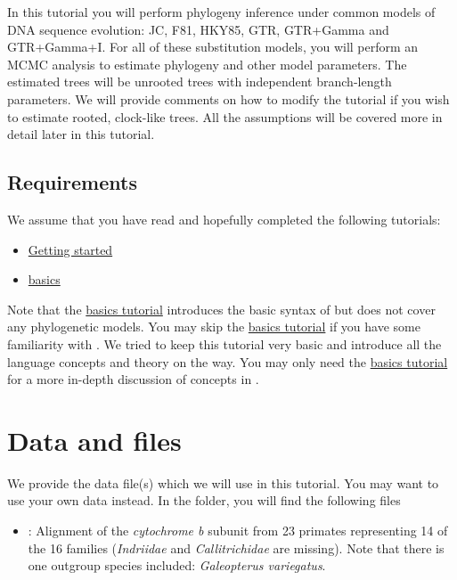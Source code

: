 In this tutorial you will perform phylogeny inference under common models of DNA sequence evolution: JC, F81, HKY85, GTR, GTR+Gamma and GTR+Gamma+I.
For all of these substitution models, you will perform an MCMC analysis to estimate phylogeny and other model parameters.
The estimated trees will be unrooted trees with independent branch-length parameters. 
We will provide comments on how to modify the tutorial if you wish to estimate rooted, clock-like trees.
All the assumptions will be covered more in detail later in this tutorial.

\subsection{Requirements}
We assume that you have read and hopefully completed the following tutorials:
\begin{itemize}
\item \href{https://github.com/revbayes/revbayes_tutorial/raw/master/tutorial_TeX/RB_Getting_Started/RB_Getting_Started.pdf}{Getting started}
\item \href{https://github.com/revbayes/revbayes_tutorial/raw/master/tutorial_TeX/RB_Basics_Tutorial/RB_Basics_Tutorial.pdf}{\Rev basics}
\end{itemize}
Note that the \href{https://github.com/revbayes/revbayes_tutorial/raw/master/tutorial_TeX/RB_Basics_Tutorial/RB_Basics_Tutorial.pdf}{\Rev basics tutorial} introduces the basic syntax of \Rev but does not cover any phylogenetic models.
You may skip the \href{https://github.com/revbayes/revbayes_tutorial/raw/master/tutorial_TeX/RB_Basics_Tutorial/RB_Basics_Tutorial.pdf}{\Rev basics tutorial} if you have some familiarity with \R.
We tried to keep this tutorial very basic and introduce all the language concepts and theory on the way.
You may only need the \href{https://github.com/revbayes/revbayes_tutorial/raw/master/tutorial_TeX/RB_Basics_Tutorial/RB_Basics_Tutorial.pdf}{\Rev basics tutorial} for a more in-depth discussion of concepts in \Rev.




\section{Data and files}

We provide the data file(s) which we will use in this tutorial.
You may want to use your own data instead.
In the  folder, you will find the following files
\begin{itemize}
\item
{}: Alignment of the \textit{cytochrome b} subunit from 23 primates representing 14 of the 16 families (\textit{Indriidae} and \textit{Callitrichidae} are missing). Note that there is one outgroup species included: \emph{Galeopterus variegatus}.
\end{itemize}



